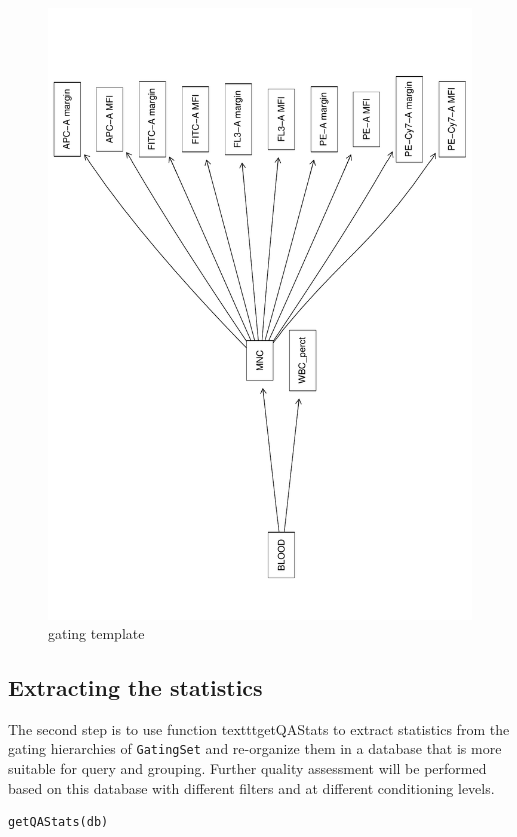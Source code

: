 \documentclass[10pt]{bmc_article}
\newenvironment{bmcformat}{\baselineskip20pt\sloppy\setboolean{publ}{false}}{\baselineskip20pt\sloppy}
\begin{document}
\begin{bmcformat}
\begin{figure}[h]
\includegraphics[totalheight=120mm,angle=-90]{image/gatingHierarchy.pdf}
\caption{gating template} 
\end{figure}

\subsection{Extracting the statistics}
The second step is to use function texttt{getQAStats} to extract statistics from
the gating hierarchies of \texttt{GatingSet} and re-organize them in a database that is more suitable
for query and grouping. Further quality assessment will be performed
based on this database with different filters and at different conditioning
levels.

\begin{verbatim}
getQAStats(db)
\end{verbatim}


\end{bmcformat}
\end{document}
